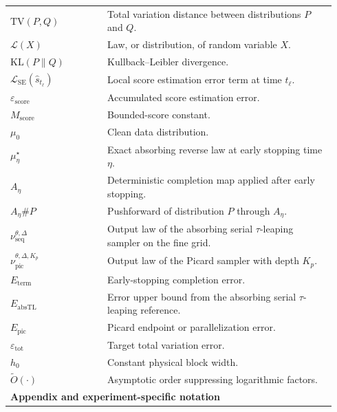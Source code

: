 \documentclass{article}
\newcommand{\TV}{\mathrm{TV}}
\newcommand{\Law}{\mathcal{L}}
\begin{document}
\begin{longtable}{p{0.28\linewidth}p{0.66\linewidth}}
\(\TV(P,Q)\) & Total variation distance between distributions \(P\) and \(Q\). \\
\(\Law(X)\) & Law, or distribution, of random variable \(X\). \\
\(\mathrm{KL}(P\|Q)\) & Kullback--Leibler divergence. \\
\(\mathcal L_{\mathrm{SE}}(\widehat s_{t_\ell})\) & Local score estimation error term at time \(t_\ell\). \\
\(\varepsilon_{\mathrm{score}}\) & Accumulated score estimation error. \\
\(M_{\mathrm{score}}\) & Bounded-score constant. \\
\(\mu_0\) & Clean data distribution. \\
\(\mu_\eta^\star\) & Exact absorbing reverse law at early stopping time \(\eta\). \\
\(A_\eta\) & Deterministic completion map applied after early stopping. \\
\(A_\eta\#P\) & Pushforward of distribution \(P\) through \(A_\eta\). \\
\(\nu_{\mathrm{seq}}^{\theta,\Delta}\) & Output law of the absorbing serial \(\tau\)-leaping sampler on the fine grid. \\
\(\nu_{\mathrm{pic}}^{\theta,\Delta,K_p}\) & Output law of the Picard sampler with depth \(K_p\). \\
\(E_{\mathrm{term}}\) & Early-stopping completion error. \\
\(E_{\mathrm{absTL}}\) & Error upper bound from the absorbing serial \(\tau\)-leaping reference. \\
\(E_{\mathrm{pic}}\) & Picard endpoint or parallelization error. \\
\(\varepsilon_{\mathrm{tot}}\) & Target total variation error. \\
\(h_0\) & Constant physical block width. \\
\(\widetilde O(\cdot)\) & Asymptotic order suppressing logarithmic factors. \\

\midrule
\multicolumn{2}{l}{\textbf{Appendix and experiment-specific notation}}\\
\midrule


\end{longtable}
\end{document}
